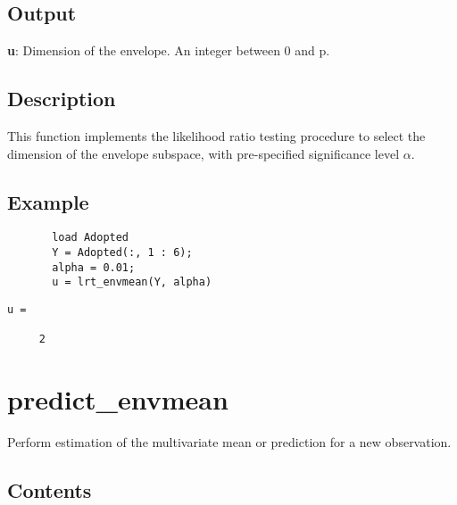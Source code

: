 \documentclass[a4paper,11pt,openany]{memoir}
\begin{document}
\subsection*{Output}

\begin{par}
\textbf{u}: Dimension of the envelope. An integer between 0 and p.
\end{par} \vspace{1em}


\subsection*{Description}

\begin{par}
This function implements the likelihood ratio testing procedure to select the dimension of the envelope subspace, with pre-specified significance level $\alpha$.
\end{par} \vspace{1em}

\subsection*{Example}


\begin{verbatim}       load Adopted
       Y = Adopted(:, 1 : 6);
       alpha = 0.01;
       u = lrt_envmean(Y, alpha)\end{verbatim}
    
        \color{lightgray} \begin{verbatim}
u =

     2

\end{verbatim} \color{black}

\newpage

\rmfamily
\color{black}\section{predict\_envmean}

\begin{par}
Perform estimation of the multivariate mean or prediction for a new observation.
\end{par} \vspace{1em}

\subsection*{Contents}
\end{document}
